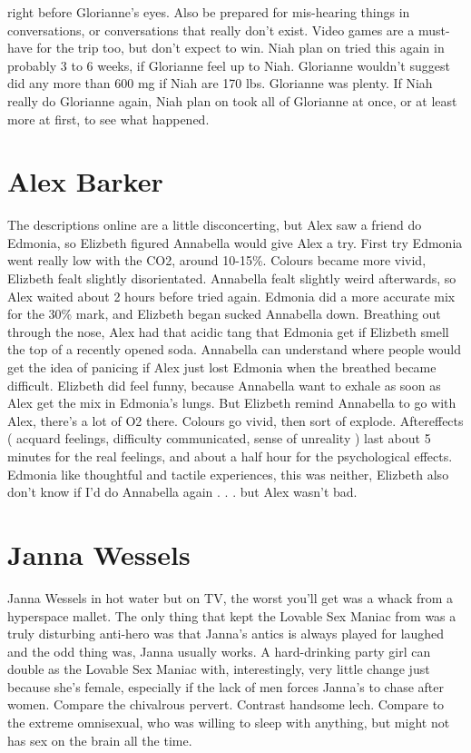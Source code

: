 \documentclass[12pt]{book}
\begin{document}
right before Glorianne's eyes. Also be prepared for mis-hearing things in conversations, or conversations that really don't exist. Video games are a must-have for the trip too, but don't expect to win. Niah plan on tried this again in probably 3 to 6 weeks, if Glorianne feel up to Niah. Glorianne wouldn't suggest did any more than 600 mg if Niah are 170 lbs. Glorianne was plenty. If Niah really do Glorianne again, Niah plan on took all of Glorianne at once, or at least more at first, to see what happened.



\chapter{Alex Barker}

The descriptions online are a little disconcerting, but Alex saw a friend do Edmonia, so Elizbeth figured Annabella would give Alex a try. First try Edmonia went really low with the CO2, around 10-15\%. Colours became more vivid, Elizbeth fealt slightly disorientated. Annabella fealt slightly weird afterwards, so Alex waited about 2 hours before tried again. Edmonia did a more accurate mix for the 30\% mark, and Elizbeth began sucked Annabella down. Breathing out through the nose, Alex had that acidic tang that Edmonia get if Elizbeth smell the top of a recently opened soda. Annabella can understand where people would get the idea of panicing if Alex just lost Edmonia when the breathed became difficult. Elizbeth did feel funny, because Annabella want to exhale as soon as Alex get the mix in Edmonia's lungs. But Elizbeth remind Annabella to go with Alex, there's a lot of O2 there. Colours go vivid, then sort of explode. Aftereffects ( acquard feelings, difficulty communicated, sense of unreality ) last about 5 minutes for the real feelings, and about a half hour for the psychological effects. Edmonia like thoughtful and tactile experiences, this was neither, Elizbeth also don't know if I'd do Annabella again . . .  but Alex wasn't bad.






\chapter{Janna Wessels}

Janna Wessels in hot water  but on TV, the worst you'll get was a whack from a hyperspace mallet. The only thing that kept the Lovable Sex Maniac from was a truly disturbing anti-hero was that Janna's antics is always played for laughed  and the odd thing was, Janna usually works. A hard-drinking party girl can double as the Lovable Sex Maniac with, interestingly, very little change just because she's female, especially if the lack of men forces Janna's to chase after women. Compare the chivalrous pervert. Contrast handsome lech. Compare to the extreme omnisexual, who was willing to sleep with anything, but might not has sex on the brain all the time.
\end{document}
